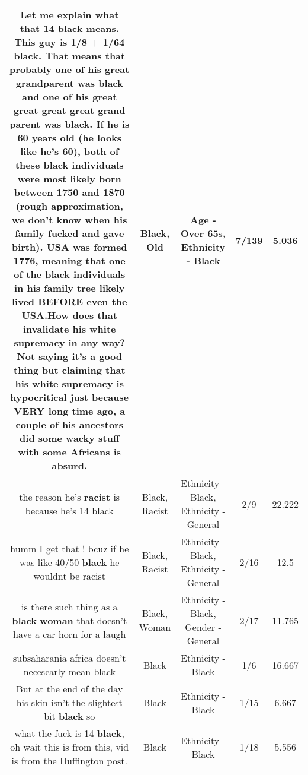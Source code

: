 \documentclass[11pt]{article}
\newlength\mylength
\begin{document}
\begin{center}
\begin{longtable}{|C{.65\mylength}|C{.30\mylength}|C{.12\mylength}|C{.12\mylength}|C{.12\mylength}|}
  \small Let me explain what that 14 \textbf{black} means. This guy is 1/8 + 1/64 \textbf{black}. That means that probably one of his great grandparent was \textbf{black} and one of his great great great great grand parent was \textbf{black}. If he is 60 years \textbf{old} (he looks like he's 60), both of these \textbf{black} individuals were most likely born between 1750 and 1870 (rough approximation, we don't know when his family fucked and gave birth). USA was formed 1776, meaning that one of the \textbf{black} individuals in his family tree likely lived BEFORE even the USA.How does that invalidate his white supremacy in any way? Not saying it's a good thing but claiming that his white supremacy is hypocritical just because VERY long time ago, a couple of his ancestors did some wacky stuff with some Africans is absurd.\normalsize   & Black, Old & Age - Over 65s, Ethnicity - Black & 7/139 & 5.036 \\  \hline
  \small the reason he's \textbf{racist} is because he's 14 black\normalsize   & Black, Racist & Ethnicity - Black, Ethnicity - General & 2/9 & 22.222 \\  \hline
  \small humm I get that ! bcuz if he was like 40/50  \textbf{black} he wouldnt be racist\normalsize   & Black, Racist & Ethnicity - Black, Ethnicity - General & 2/16 & 12.5 \\  \hline
  \small is there such thing as a \textbf{black} \textbf{woman} that doesn't have a car horn for a laugh\normalsize   & Black, Woman & Ethnicity - Black, Gender - General & 2/17 & 11.765 \\  \hline
  \small subsaharania africa doesn't necescarly mean black\normalsize   & Black & Ethnicity - Black & 1/6 & 16.667 \\  \hline
  \small But at the end of the day his skin isn't the slightest bit \textbf{black} so\normalsize   & Black & Ethnicity - Black & 1/15 & 6.667 \\  \hline
  \small what the fuck is 14 \textbf{black}, oh wait this is from this, vid is from the Huffington post.\normalsize   & Black & Ethnicity - Black & 1/18 & 5.556 \\  \hline

\end{longtable}
\end{center}
\end{document}
